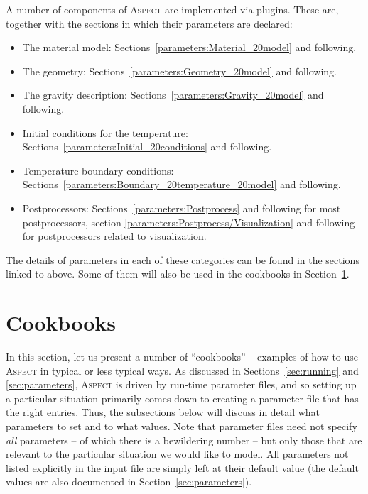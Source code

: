 \documentclass{article}
\newcommand{\aspect}{\textsc{Aspect}}
\begin{document}
\begin{itemize}
  A number of components of \aspect{} are implemented via plugins. These are,
  together with the sections in which their parameters are declared:
  \begin{itemize}
  \item The material model:
    Sections~\ref{parameters:Material_20model} and following.
  \item The geometry:
    Sections~\ref{parameters:Geometry_20model} and following.
  \item The gravity description:
    Sections~\ref{parameters:Gravity_20model} and following.
  \item Initial conditions for the temperature:
    Sections~\ref{parameters:Initial_20conditions} and following.
  \item Temperature boundary conditions:
    Sections~\ref{parameters:Boundary_20temperature_20model} and following.
  \item Postprocessors:
    Sections~\ref{parameters:Postprocess} and following for most postprocessors,
    section \ref{parameters:Postprocess/Visualization} and following for
    postprocessors related to visualization.
  \end{itemize}
\end{itemize}

The details of parameters in each of these categories can be found in the
sections linked to above. Some of them will also be used in the cookbooks in
Section~\ref{sec:cookbooks}.





\section{Cookbooks}
\label{sec:cookbooks}

In this section, let us present a number of ``cookbooks'' -- examples of how
to use \aspect{} in typical or less typical ways. As discussed in
Sections~\ref{sec:running} and \ref{sec:parameters}, \aspect{} is driven by
run-time parameter files, and so setting up a particular situation primarily
comes down to creating a parameter file that has the right entries. Thus, the
subsections below will discuss in detail what parameters to set and to what
values. Note that parameter files need not specify \textit{all} parameters --
of which there is a bewildering number -- but only those that are relevant to
the particular situation we would like to model. All parameters not listed
explicitly in the input file are simply left at their default value (the
default values are also documented in Section~\ref{sec:parameters}).
\end{document}
